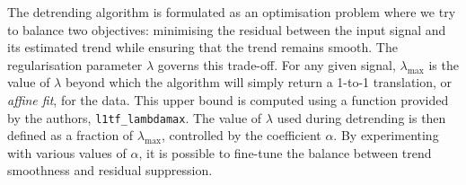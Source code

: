 The detrending algorithm is formulated as an optimisation problem where we try to balance two objectives: minimising the residual between the input signal and its estimated trend while ensuring that the trend remains smooth. The regularisation parameter $\lambda$ governs this trade-off. For any given signal, $\lambda_{\text{max}}$ is the value of $\lambda$ beyond which the algorithm will simply return a 1-to-1 translation, or \textit{affine fit}, for the data. This upper bound is computed using a function provided by the authors, \texttt{l1tf\_lambdamax}. The value of $\lambda$ used during detrending is then defined as a fraction of $\lambda_{\text{max}}$, controlled by the coefficient $\alpha$. By experimenting with various values of $\alpha$, it is possible to fine-tune the balance between trend smoothness and residual suppression.

